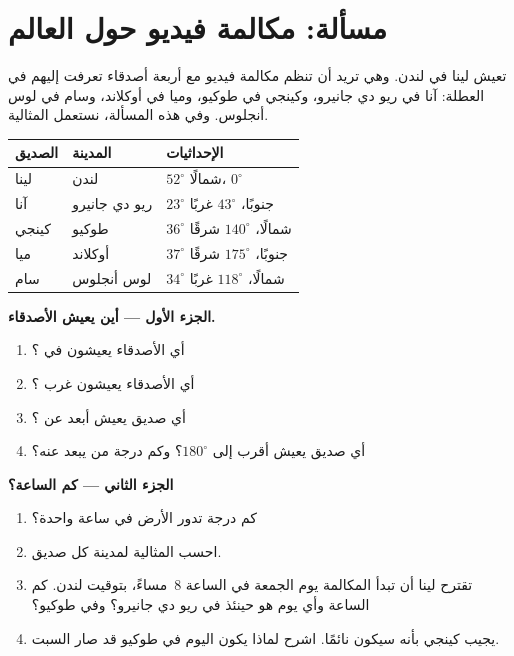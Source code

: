 \section{مسألة: مكالمة فيديو حول العالم}

\begin{problem}
\label{pb:g6:latitude-longitude:1}
تعيش لينا في لندن. وهي تريد أن تنظم مكالمة فيديو مع أربعة أصدقاء
تعرفت إليهم في العطلة: آنا في ريو دي جانيرو، وكينجي في طوكيو، وميا في أوكلاند،
وسام في لوس أنجلوس. وفي هذه المسألة، نستعمل  المثالية.

\begin{center}
\small
\begin{tabular}{lll}
\hline
الصديق & المدينة & الإحداثيات\\
\hline
لينا & لندن & $52^\circ$ شمالًا، $0^\circ$\\
آنا & ريو دي جانيرو & $23^\circ$ جنوبًا، $43^\circ$ غربًا\\
كينجي & طوكيو & $36^\circ$ شمالًا، $140^\circ$ شرقًا\\
ميا & أوكلاند & $37^\circ$ جنوبًا، $175^\circ$ شرقًا\\
سام & لوس أنجلوس & $34^\circ$ شمالًا، $118^\circ$ غربًا\\
\hline
\end{tabular}
\end{center}

\medskip
\noindent\textbf{الجزء الأول --- أين يعيش الأصدقاء.}
\begin{enumerate}
  \item أي الأصدقاء يعيشون في ؟
  \item أي الأصدقاء يعيشون غرب ؟
  \item أي صديق يعيش أبعد عن ؟
  \item أي صديق يعيش أقرب إلى  $180^\circ$؟ وكم
        درجة من  يبعد عنه؟
\end{enumerate}

\medskip
\noindent\textbf{الجزء الثاني --- كم الساعة؟}
\begin{enumerate}[resume]
  \item كم درجة تدور الأرض في ساعة واحدة؟
  \item احسب  المثالية لمدينة كل صديق.
  \item تقترح لينا أن تبدأ المكالمة يوم الجمعة في الساعة 8~مساءً، بتوقيت لندن.
        كم الساعة وأي يوم هو حينئذ في ريو دي جانيرو؟ وفي طوكيو؟
  \item يجيب كينجي بأنه سيكون نائمًا. اشرح لماذا يكون اليوم
        في طوكيو قد صار السبت.
\end{enumerate}


\end{problem}
